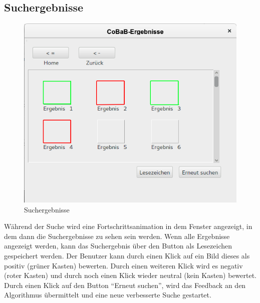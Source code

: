 \subsection{Suchergebnisse}
\begin{figure}[H]
\includegraphics[width=1\linewidth]{img/Suchergebnisse2}
\caption{Suchergebnisse}
\label{fig:suchergebnisse}
\end{figure}
Während der Suche wird eine Fortschrittsanimation in dem Fenster angezeigt, in dem dann die Suchergebnisse zu sehen sein werden. Wenn alle Ergebnisse angezeigt werden, kann das Suchergebnis über den Button als Lesezeichen gespeichert werden.\newline 
Der Benutzer kann durch einen Klick auf ein Bild dieses als positiv (grüner Kasten) bewerten. Durch einen weiteren Klick wird es negativ (roter Kasten) und durch noch einen Klick wieder neutral (kein Kasten) bewertet. Durch einen Klick auf den Button \enquote{Erneut suchen}, wird das Feedback an den Algorithmus übermittelt und eine neue verbesserte Suche gestartet.
\pagebreak
